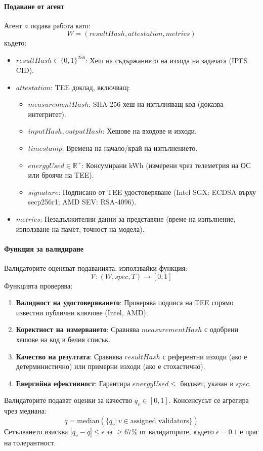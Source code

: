 \documentclass[11pt]{article}
\begin{document}
\paragraph{Подаване от агент} Агент $a$ подава работа като:
\begin{equation}
W = (resultHash, attestation, metrics)
\end{equation}
където:
\begin{itemize}[noitemsep]
  \item $resultHash \in \{0,1\}^{256}$: Хеш на съдържанието на изхода на задачата (IPFS CID).
  \item $attestation$: TEE доклад, включващ:
    \begin{itemize}[noitemsep]
      \item $measurementHash$: SHA-256 хеш на изпълняващ код (доказва интегритет).
      \item $inputHash, outputHash$: Хешове на входове и изходи.
      \item $timestamp$: Времена на начало/край на изпълнението.
      \item $energyUsed \in \mathbb{R}^+$: Консумирани kWh (измерени чрез телеметрия на ОС или броячи на TEE).
      \item $signature$: Подписано от TEE удостоверяване (Intel SGX: ECDSA върху secp256r1; AMD SEV: RSA-4096).
    \end{itemize}
  \item $metrics$: Незадължителни данни за представяне (време на изпълнение, използване на памет, точност на модела).
\end{itemize}

\paragraph{Функция за валидиране} Валидаторите оценяват подаванията, използвайки функция:
\begin{equation}
\mathcal{V}: (W, spec, T) \rightarrow [0, 1]
\end{equation}
Функцията проверява:
\begin{enumerate}[noitemsep]
  \item \textbf{Валидност на удостоверяването}: Проверява подписа на TEE спрямо известни публични ключове (Intel, AMD).
  \item \textbf{Коректност на измерването}: Сравнява $measurementHash$ с одобрени хешове на код в белия списък.
  \item \textbf{Качество на резултата}: Сравнява $resultHash$ с референтни изходи (ако е детерминистично) или примерни изходи (ако е стохастично).
  \item \textbf{Енергийна ефективност}: Гарантира $energyUsed \leq$ бюджет, указан в $spec$.
\end{enumerate}
Валидаторите подават оценки за качество $q_v \in [0,1]$. Консенсусът се агрегира чрез медиана:
\begin{equation}
q = \text{median}(\{q_v : v \in \text{assigned validators}\})
\end{equation}
Сетълването изисква $|q_v - q| \leq \epsilon$ за $\geq 67\%$ от валидаторите, където $\epsilon = 0.1$ е праг на толерантност.
\end{document}
